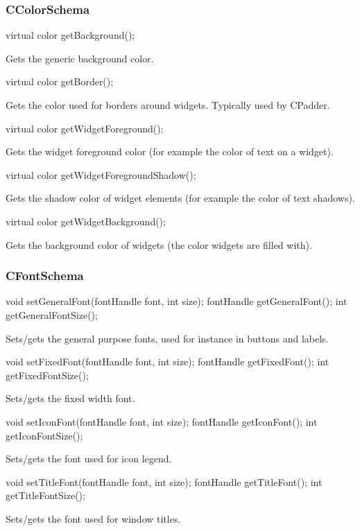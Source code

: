 \documentclass[a4paper,11pt]{journal}
\begin{document}
\subsubsection{CColorSchema}
\begin{verbatimtab}virtual color getBackground();\end{verbatimtab}
Gets the generic background color.\\
\begin{verbatimtab}virtual color getBorder();\end{verbatimtab}
Gets the color used for borders around widgets. Typically used by CPadder. \\
\begin{verbatimtab}virtual color getWidgetForeground();\end{verbatimtab}
Gets the widget foreground color (for example the color of text on a widget). \\
\begin{verbatimtab}virtual color getWidgetForegroundShadow();\end{verbatimtab}
Gets the shadow color of widget elements (for example the color of text shadows). \\
\begin{verbatimtab}virtual color getWidgetBackground();\end{verbatimtab}
Gets the background color of widgets (the color widgets are filled with).

\subsubsection{CFontSchema}
\begin{verbatimtab}
void setGeneralFont(fontHandle font, int size);
fontHandle getGeneralFont();
int getGeneralFontSize();
\end{verbatimtab}
Sets/gets the general purpose fonts, used for instance in buttons and labels. \\
\begin{verbatimtab}
void setFixedFont(fontHandle font, int size);
fontHandle getFixedFont();
int getFixedFontSize();
\end{verbatimtab}
Sets/gets the fixed width font. \\
\begin{verbatimtab}
void setIconFont(fontHandle font, int size);
fontHandle getIconFont();
int getIconFontSize();
\end{verbatimtab}
Sets/gets the font used for icon legend. \\
\begin{verbatimtab}
void setTitleFont(fontHandle font, int size);
fontHandle getTitleFont();
int getTitleFontSize();
\end{verbatimtab}
Sets/gets the font used for window titles.
\end{document}
